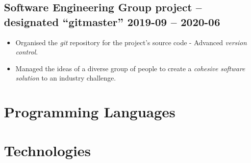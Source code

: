     \subsection{Software Engineering Group project -- designated ``gitmaster''
    \hfill 2019-09 -- 2020-06}
        \begin{itemize}
            \item Organised the \emph{git} repository for the project's source
                code - Advanced \emph{version control}.
            \item Managed the ideas of a diverse group of people to create a
                \emph{cohesive software solution} to an industry challenge.
        \end{itemize}
\section{Programming Languages}
\section{Technologies}

